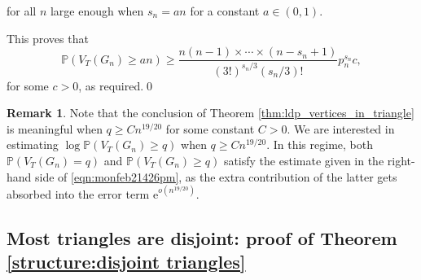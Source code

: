 \documentclass[bj,authoryear,noshowframe]{imsart}
\numberwithin{equation}{section}
\theoremstyle{plain}
\theoremstyle{definition}
\newtheorem{rmk}[thm]{Remark}
\newcommand{\eqn}[1]{\begin{equation}#1\end{equation}}
\newcommand{\e}{{\mathrm e}}
\begin{document}
for all $n$ large enough when $s_n=an$ for a constant $a\in (0,1)$.
\smallskip\noindent

This proves that 
	\eqn{
	\mathbb{P}(V_{ T}(G_n)\geq an) \geq \frac{n(n-1) \times\cdots\times (n-s_n+1)}{(3!)^{s_n/3}(s_n/3)!}p_n^{s_n} c,
	}
for some $c>0$, as required.\qed

\begin{rmk}
{\rm Note that the conclusion of Theorem \ref{thm:ldp_vertices_in_triangle} is meaningful when $q\geq Cn^{19/20}$ for some constant $C>0$. We are interested in estimating $\log{\mathbb{P}(V_{T}(G_n) \geq q)}$ when $q\geq Cn^{19/20}$. In this regime, both $\mathbb{P}(V_{T}(G_n)  = q)$ and $\mathbb{P}(V_{T}(G_n) \geq q)$ satisfy the estimate given in the right-hand side of \eqref{eqn:monfeb21426pm}, as the extra contribution of the latter gets absorbed into the error term $\e^{o(n^{19/20})}$.}
\end{rmk}


\subsection{Most triangles are disjoint: proof of Theorem \ref{structure:disjoint triangles}}
\label{sec:trianglesdisjoint}
\end{document}
